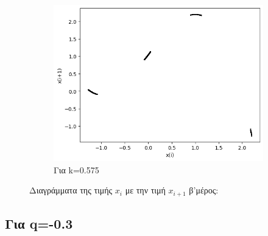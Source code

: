 \begin{figure}[h!]
\begin{subfigure}[c]{0.4\textwidth}
		\includegraphics[width=\textwidth]{LateX images/graphs/k0575}
		\caption{Για k=0.575}
		\label{f:k14}
	\end{subfigure}
\caption{Διαγράμματα της τιμής \(x_i\) με την τιμή \(x_{i+1}\) β'μέρος:}
\end{figure}
\vfill
\clearpage
\newpage
\subsection{Για q=-0.3}

